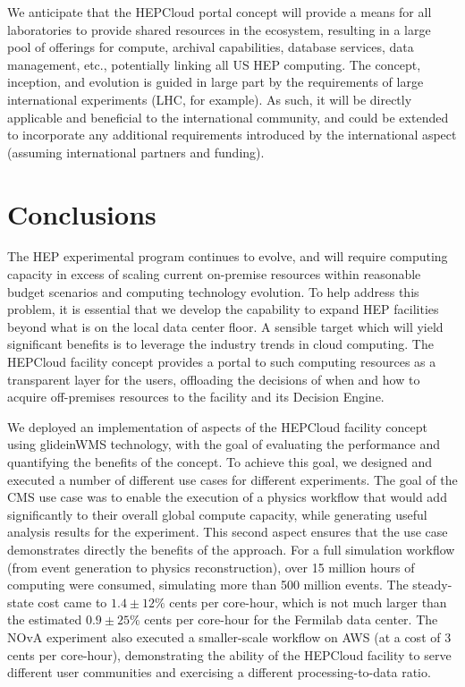 \documentclass[twocolumn]{svjour3}          %
\begin{document}
We  anticipate that the HEPCloud portal concept will provide a means for all laboratories to provide shared resources in the ecosystem, resulting in a large pool of offerings for compute, archival capabilities, database services, data management, etc., potentially linking all US HEP computing.
The concept, inception, and evolution is guided in large part by
the requirements of large international experiments (LHC, for example).
As such, it will be directly applicable and beneficial to the international
community, and could be extended to incorporate any additional requirements
introduced by the international aspect
(assuming international partners and funding).

\section{Conclusions}

The HEP experimental program continues to evolve, and will require computing capacity in excess of scaling current on-premise resources within reasonable budget scenarios and computing technology evolution. To help address this problem, it is essential that
we develop the capability to expand HEP facilities beyond what is on the local data center floor. A sensible target which will yield significant benefits is to leverage the industry trends in cloud computing. The HEPCloud facility concept provides a portal to such computing resources as a transparent
layer for the users, offloading the decisions of when and how to acquire off-premises resources to the facility and its Decision Engine.

We deployed an implementation of aspects of the HEPCloud facility concept using glideinWMS technology, with the goal of evaluating the performance and quantifying the benefits of the concept.  To achieve this goal, we designed and executed a number of different use cases for different experiments. The goal of the
CMS use case was to enable the execution of a physics workflow that would add significantly to their overall global compute capacity, while generating useful analysis results for the experiment.  This second aspect ensures that the use case demonstrates directly the benefits of the approach.
For a full simulation workflow (from event generation to physics reconstruction), over 15 million hours of computing were consumed,
simulating more than 500 million events. The steady-state cost came to $1.4 \pm 12\%$ cents per core-hour, which is not much larger than the estimated
$0.9 \pm 25\%$ cents per core-hour for the Fermilab data center. The NOvA experiment also executed a smaller-scale workflow on AWS (at a cost of 3 cents per core-hour),
demonstrating the ability of the HEPCloud facility to serve different user communities and exercising a different processing-to-data ratio.
\end{document}
